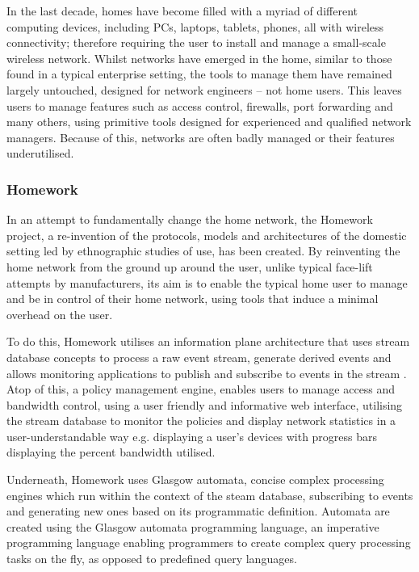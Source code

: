 In the last decade, homes have become filled with a myriad of different computing devices, including PCs, laptops, tablets, phones, all with wireless connectivity; therefore requiring the user to install and manage a small-scale wireless network. Whilst networks have emerged in the home, similar to those found in a typical enterprise setting, the tools to manage them have remained largely untouched, designed for network engineers -- not home users. This leaves users to manage features such as access control, firewalls, port forwarding and many others, using primitive tools designed for experienced and qualified network managers. Because of this, networks are often badly managed or their features underutilised.
\subsubsection{Homework} %
\label{ssub:homework}
In an attempt to fundamentally change the home network, the Homework project\cite{Homework, HomeworkControl}, a re-invention of the protocols, models and architectures of the domestic setting led by ethnographic studies of use, has been created. By reinventing the home network from the ground up around the user, unlike typical face-lift attempts by manufacturers, its aim is to enable the typical home user to manage and be in control of their home network, using tools that induce a minimal overhead on the user. 

To do this, Homework utilises an information plane architecture that uses stream database concepts to process a raw event stream, generate derived events and allows monitoring applications to publish and subscribe to events in the stream \cite{InformationPlane}. Atop of this, a policy management engine, enables users to manage access and bandwidth control, using a user friendly and informative web interface, utilising the stream database to monitor the policies and display network statistics in a user-understandable way e.g. displaying a user's devices with progress bars displaying the percent bandwidth utilised.

Underneath, Homework uses Glasgow automata\cite{DEBSChallenge}, concise complex processing engines which run within the context of the steam database, subscribing to events and generating new ones based on its programmatic definition. Automata are created using the Glasgow automata programming language, an imperative programming language enabling programmers to create complex query processing tasks on the fly, as opposed to predefined query languages.

